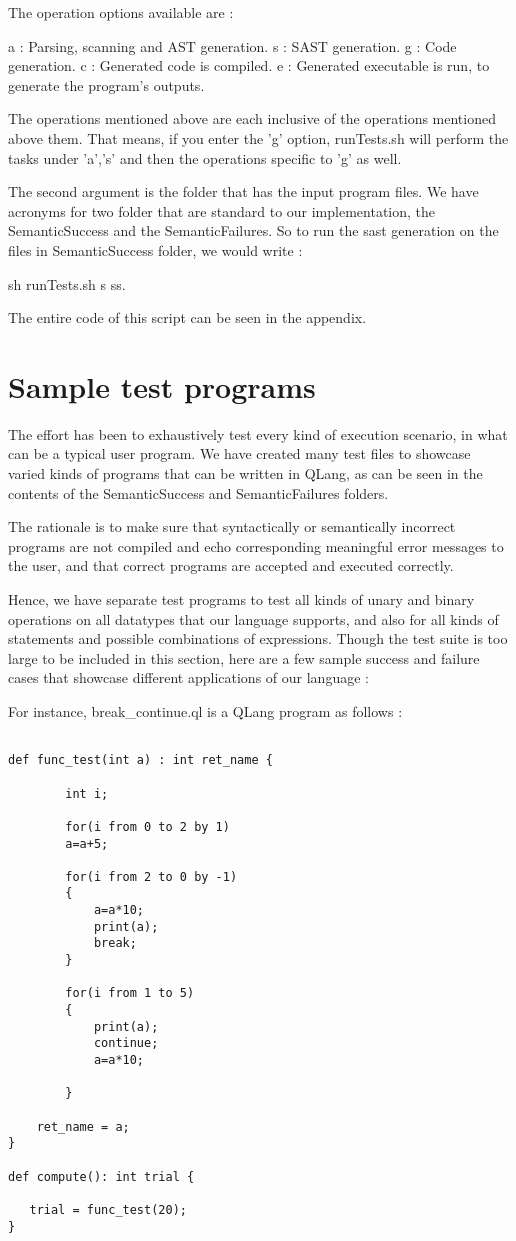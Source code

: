 The operation options available are :

a : Parsing, scanning and AST generation.
s : SAST generation.
g : Code generation.
c : Generated code is compiled.
e : Generated executable is run, to generate the program's outputs. 

The operations mentioned above are each inclusive of the operations mentioned above them. That means, if you enter the 'g' option, runTests.sh will perform the tasks under 'a','s' and then the operations specific to 'g' as well.

The second argument is the folder that has the input program files. We have acronyms for two folder that are standard to our implementation, the SemanticSuccess and the SemanticFailures. So to run the sast generation on the files in SemanticSuccess folder, we would write :

sh runTests.sh s ss.

The entire code of this script can be seen in the appendix.


\section{Sample test programs}

The effort has been to exhaustively test every kind of execution scenario, in what can be a typical user program. We have created many test files to showcase varied kinds of programs that can be written in QLang, as can be seen in the contents of the SemanticSuccess and SemanticFailures folders.

The rationale is to make sure that syntactically or semantically incorrect programs are not compiled and echo corresponding meaningful error messages to the user, and that correct programs are accepted and executed correctly.

Hence, we have separate test programs to test all kinds of unary and binary operations on all datatypes that our language supports, and also for all kinds of statements and possible combinations of expressions. 
Though the test suite is too large to be included in this section, here are a few sample success and failure cases that showcase different applications of our language :


For instance, break_continue.ql is a QLang program as follows :

\begin{verbatim}

def func_test(int a) : int ret_name { 
        
        int i;

        for(i from 0 to 2 by 1)
        a=a+5;

        for(i from 2 to 0 by -1)
        {
            a=a*10;
            print(a);
            break;
        }

        for(i from 1 to 5)
        {
            print(a);
            continue;
            a=a*10;

        }

    ret_name = a;
}

def compute(): int trial {

   trial = func_test(20);
} 
\end{verbatim}


